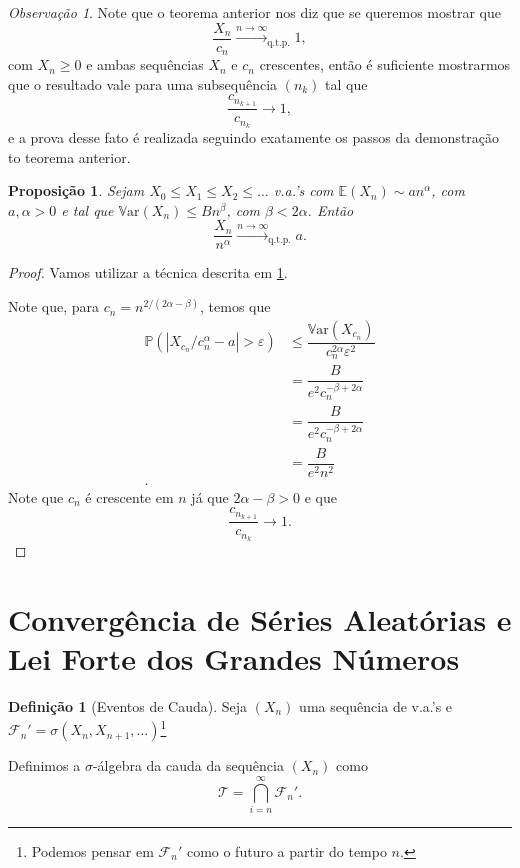 \documentclass[12pt,a4paper,oneside]{book}
\newtheorem{proposition}[theorem]{Proposi\c{c}\~ao}
\theoremstyle{definition}
\newtheorem{definition}[theorem]{Defini\c{c}\~ao}
\theoremstyle{remark}
\newtheorem{remark}[theorem]{Observa\c{c}\~ao}
\numberwithin{equation}{section}
\newcommand{\e}{\varepsilon}
\newcommand{\E}{\mathbb{E}}
\newcommand{\pr}{\mathbb{P}}
\newcommand{\Var}{\mathbb{V}\text{ar}}
\newcommand{\rarrowlimn}{\xrightarrow{n\rightarrow \infty}}
\begin{document}
\begin{tcolorbox}[colback = yellow!60]
\begin{remark}\label{obs-conv qtp-parasubsequencia-cq/cq+1->1}
Note que o teorema anterior nos diz que se queremos mostrar que 
$$\dfrac{X_n}{c_n}  \rarrowlimn_{\textrm{q.t.p.}} 1,$$
com $X_n \geq 0$ e ambas sequências $X_n$ e $c_n$ crescentes, então é suficiente mostrarmos que o resultado vale para uma subsequência $(n_k)$ tal que
$$\dfrac{c_{n_{k+1}}}{c_{n_{k}}}\longrightarrow 1,  $$
e a prova desse fato é realizada seguindo exatamente os passos da demonstração to teorema anterior.
\end{remark}
\end{tcolorbox}

\begin{proposition}
Sejam $X_0\leq X_1\leq X_2\leq\dots$ v.a.'s com  $\E (X_n) \sim an^\alpha$, com $a,\alpha>0$ e tal que $\Var(X_n)\leq Bn^\beta$, com $\beta<2\alpha$. Então
$$\dfrac{X_n}{n^\alpha}\rarrowlimn_{\textrm{q.t.p.}} a. $$
\end{proposition}

\begin{proof}
Vamos utilizar a técnica descrita em \ref{obs-conv qtp-parasubsequencia-cq/cq+1->1}.

Note que, para $c_n = n^{2/(2\alpha - \beta)}$, temos que
\begin{align*}
\pr(|X_{c_n}/c_n^\alpha - a|>\e) & \leq \dfrac{\Var(X_{c_n})}{c_n^{2\alpha}\e^2}\\
 &= \dfrac{B}{e^2c_n^{-\beta+2\alpha}} \\
  &= \dfrac{B}{e^2c_n^{-\beta+2\alpha}} \\
    &= \dfrac{B}{e^2n^2} \\.
\end{align*}
Note que $c_n$ é crescente em $n$ já que $2\alpha-\beta >0$ e que 
$$\dfrac{c_{n_{k+1}}}{c_{n_{k}}}\longrightarrow 1. $$
\end{proof}







\newpage
\section{Convergência de Séries Aleatórias e \\ Lei Forte dos Grandes Números}

\begin{definition}[Eventos de Cauda] Seja $(X_n)$ uma sequência de v.a.'s e  $\mathcal{F}_n' = \sigma(X_n,X_{n+1},\dots)$\footnote{Podemos pensar em $\mathcal{F}_n'$ como o futuro a partir do tempo $n$.}

Definimos a $\sigma$-álgebra da cauda da sequência $(X_n)$  como 
$$\mathcal{T} = \bigcap_{i=n}^\infty\mathcal{F}_n'.$$
\end{definition}
\end{document}
